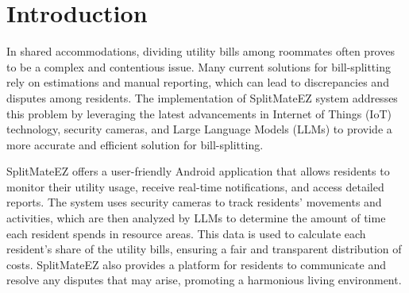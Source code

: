 \documentclass[sigconf]{acmart}
\begin{document}



\maketitle

\section{Introduction}
In shared accommodations, dividing utility bills among roommates often proves to be a complex and contentious issue. Many current solutions for bill-splitting rely on estimations and manual reporting, which can lead to discrepancies and disputes among residents. The implementation of SplitMateEZ system addresses this problem by leveraging the latest advancements in Internet of Things (IoT) technology, security cameras, and Large Language Models (LLMs) to provide a more accurate and efficient solution for bill-splitting.  

SplitMateEZ offers a user-friendly Android application that allows residents to monitor their utility usage, receive real-time notifications, and access detailed reports. The system uses security cameras to track residents' movements and activities, which are then analyzed by LLMs to determine the amount of time each resident spends in resource areas. This data is used to calculate each resident's share of the utility bills, ensuring a fair and transparent distribution of costs. SplitMateEZ also provides a platform for residents to communicate and resolve any disputes that may arise, promoting a harmonious living environment.
\end{document}

